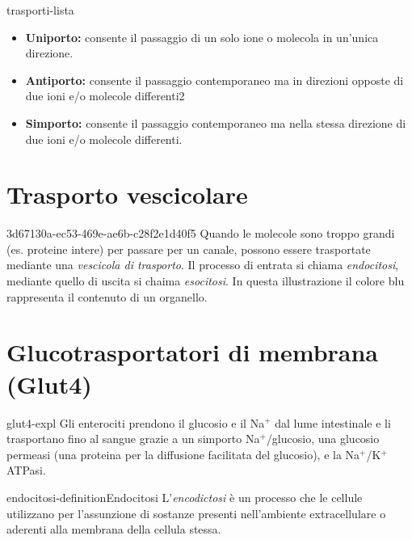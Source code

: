 \documentclass[preview]{standalone}
\begin{document}
\begin{snippet}{trasporti-lista}
    \begin{itemize}
        \item \textbf{Uniporto:} consente il passaggio di un solo ione o molecola in un'unica direzione.
        \item \textbf{Antiporto:} consente il passaggio contemporaneo ma in direzioni opposte di due ioni e/o molecole differenti2
        \item \textbf{Simporto:} consente il passaggio contemporaneo ma nella stessa direzione di due ioni e/o molecole differenti.
    \end{itemize}
\end{snippet}

\section{Trasporto vescicolare}

\begin{snippet}{3d67130a-ec53-469e-ae6b-c28f2e1d40f5}
    Quando le molecole sono troppo grandi (es. proteine intere) per passare per un canale, possono essere trasportate 
mediante una \textit{vescicola di trasporto}. Il processo di entrata si chiama \textit{endocitosi},
mediante quello di uscita si chaima \textit{esocitosi}. 
In questa illustrazione il colore blu rappresenta il contenuto di un organello.
\end{snippet}


\section{Glucotrasportatori di membrana (Glut4)}

\begin{snippet}{glut4-expl}
    Gli enterociti prendono il glucosio e il Na\({}^+\) dal lume intestinale
e li trasportano fino al sangue grazie a un simporto Na\({}^+\)/glucosio, una glucosio permeasi
(una proteina per la diffusione facilitata del glucosio), e la Na\({}^+\)/K\({}^+\)ATPasi. 
\end{snippet}

\begin{snippetdefinition}{endocitosi-definition}{Endocitosi}
    L'\textit{encodictosi} è un processo che le cellule utilizzano per l'assunzione di sostanze presenti nell'ambiente extracellulare o aderenti alla membrana della cellula stessa.
\end{snippetdefinition}
\end{document}
